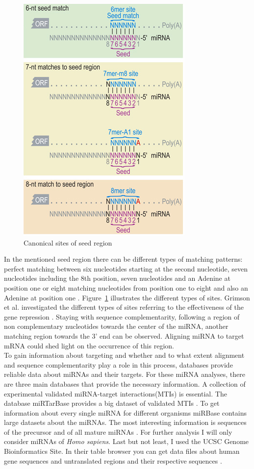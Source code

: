\documentclass[12pt,  a4paper]{report}
\begin{document}
\begin{figure}
\centering
\includegraphics[scale=0.6]{results/canonical_sites.png}
\caption{Canonical sites of seed region}
\label{Fig:canonical}
\end{figure}


In the mentioned seed region there can be different types of matching patterns: perfect matching between six nucleotides starting at the second nucleotide, seven nucleotides including the 8th position, seven nucleotides and an Adenine at position one or eight matching nucleotides from position one to eight and also an Adenine at position one \cite{Grimson}. Figure~\ref{Fig:canonical} illustrates the different types of sites. Grimson et al. investigated the different types of sites referring to the effectiveness of the gene repression \cite{Grimson}. Staying with sequence complementarity, following a region of non complementary nucleotides towards the center of the miRNA, another matching region towards the 3' end can be observed. Aligning miRNA to target mRNA could shed light on the occurrence of this region.  \\



To gain information about targeting and whether and to what extent alignment and sequence complementarity play a role in this process, databases provide reliable data about miRNAs and their targets. 
For these miRNA analyses, there are three main databases that provide the necessary information. A collection of experimental validated miRNA-target interactions(MTIs) is essential. The database miRTarBase provides a big dataset of validated MTIs \cite{Hsu}. To get information about every single miRNA for different organisms miRBase contains large datasets about the miRNAs. The most interesting information is sequences of the precursor and of all mature miRNAs \cite{mirbase}. For further analysis I will only consider miRNAs of \textit{Homo sapiens}. Last but not least, I used the UCSC Genome Bioinformatics Site. In their table browser you can get data files about human gene sequences and untranslated regions and their respective sequences \cite{ucsc}.
  
\end{document}
